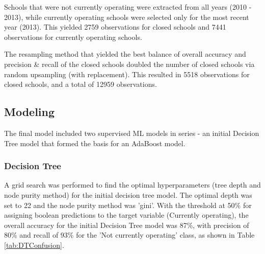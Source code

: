 \documentclass[11pt, letterpaper]{article}
\begin{document}
Schools that were not currently operating were extracted from all years (2010 - 2013), while currently operating schools were selected only for the most recent year (2013). This yielded 2759 observations for closed schools and 7441 observations for currently operating schools.

The resampling method that yielded the best balance of overall accuracy and precision \& recall of the closed schools doubled the number of closed schools via random upsampling (with replacement). This resulted in 5518 observations for closed schools, and a total of 12959 observations.

\subsection{Modeling}
The final model included two supervised ML models in series - an initial Decision Tree model that formed the basis for an AdaBoost model. 

 \subsubsection{Decision Tree}
A grid search was performed to find the optimal hyperparameters (tree depth and node purity method) for the initial decision tree model. The optimal depth was set to 22 and the node purity method was 'gini'. With the  threshold at 50\% for assigning boolean predictions to the target variable (Currently operating), the overall accuracy for the initial Decision Tree model was 87\%, with precision of 80\% and recall of 93\% for the 'Not currently operating' class, as shown in Table \ref{tab:DTConfusion}.
   
\end{document}
